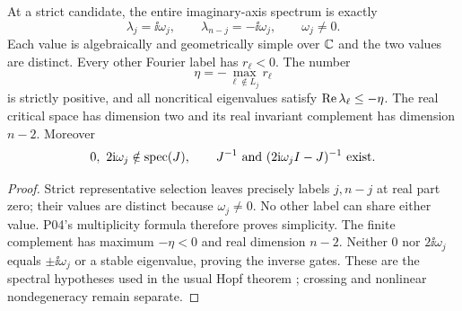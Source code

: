 \begin{theorem}
\label{thm:P11-strict}
At a strict candidate, the entire imaginary-axis spectrum is exactly
\begin{equation}
 \lambda_j=\ii\omega_j,\qquad
 \lambda_{n-j}=-\ii\omega_j,\qquad \omega_j\ne0.
 \label{eq:P11-critical-pair}
\end{equation}
Each value is algebraically and geometrically simple over $\mathbb{C}$ and the
two values are distinct. Every other Fourier label has $r_\ell<0$.
The number
\begin{equation}
 \eta=-\max_{\ell\notin L_j}r_\ell
 \label{eq:P11-gap}
\end{equation}
is strictly positive, and all noncritical eigenvalues satisfy
$\operatorname{Re}\lambda_\ell\le-\eta$. The real critical space has dimension
two and its real invariant complement has dimension $n-2$.
Moreover
\begin{equation}
 0,\ 2\ii\omega_j\notin\spec(J),\qquad
 J^{-1}\ \hbox{and}\ (2\ii\omega_j I-J)^{-1}\ \hbox{exist}.
 \label{eq:P11-resolvent-gates}
\end{equation}
\end{theorem}
\begin{proof}
Strict representative selection leaves precisely labels $j,n-j$ at
real part zero; their values are distinct because $\omega_j\ne0$.
No other label can share either value. P04's multiplicity formula
therefore proves simplicity. The finite complement has maximum
$-\eta<0$ and real dimension $n-2$. Neither $0$ nor $2\ii\omega_j$
equals $\pm\ii\omega_j$ or a stable eigenvalue, proving the inverse gates.
These are the spectral hypotheses used in the usual Hopf theorem
\cite{KuznetsovHopf2006}; crossing and nonlinear nondegeneracy remain separate.
\end{proof}

